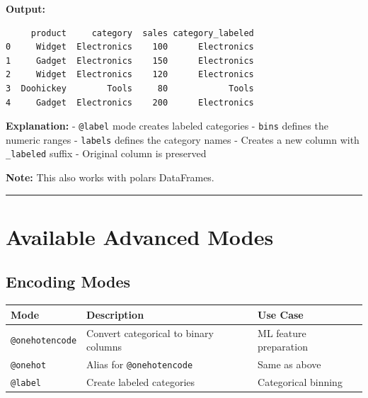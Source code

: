 \documentclass[
  letterpaper,
]{scrbook}
\begin{document}
\textbf{Output:}

\begin{verbatim}
     product     category  sales category_labeled
0     Widget  Electronics    100      Electronics
1     Gadget  Electronics    150      Electronics
2     Widget  Electronics    120      Electronics
3  Doohickey        Tools     80            Tools
4     Gadget  Electronics    200      Electronics
\end{verbatim}

\textbf{Explanation:} -
\texttt{\textquotesingle{}@label\textquotesingle{}} mode creates labeled
categories - \texttt{bins} defines the numeric ranges - \texttt{labels}
defines the category names - Creates a new column with
\texttt{\_labeled} suffix - Original column is preserved

\textbf{Note:} This also works with polars DataFrames.

\begin{center}\rule{0.5\linewidth}{0.5pt}\end{center}

\section{Available Advanced Modes}\label{available-advanced-modes}

\subsection{Encoding Modes}\label{encoding-modes}

\begin{longtable}[]{@{}
  >{\raggedright\arraybackslash}p{}
  >{\raggedright\arraybackslash}p{}
  >{\raggedright\arraybackslash}p{}@{}}
\toprule\noalign{}
\begin{minipage}[b]{\linewidth}\raggedright
Mode
\end{minipage} & \begin{minipage}[b]{\linewidth}\raggedright
Description
\end{minipage} & \begin{minipage}[b]{\linewidth}\raggedright
Use Case
\end{minipage} \\
\midrule\noalign{}
\endhead
\bottomrule\noalign{}
\endlastfoot
\texttt{@onehotencode} & Convert categorical to binary columns & ML
feature preparation \\
\texttt{@onehot} & Alias for \texttt{@onehotencode} & Same as above \\
\texttt{@label} & Create labeled categories & Categorical binning \\
\end{longtable}
\end{document}
